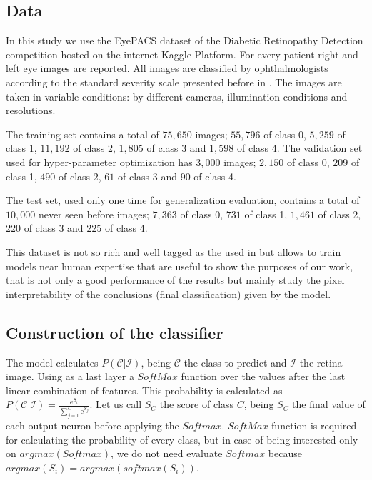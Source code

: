 \documentclass[preprint]{elsarticle}
\theoremstyle{definition} %
\theoremstyle{remark}
\newcommand{\me}{\mathrm{e}} %
\begin{document}
\subsection{Data}

In this study we use the EyePACS dataset of the Diabetic Retinopathy Detection competition hosted on the internet Kaggle Platform.  For every patient right and left eye images are reported. All images are classified by ophthalmologists according to the standard severity scale presented before in \cite{diaclass}. The images are taken in variable conditions: by different cameras, illumination conditions and resolutions. 

The training set contains a total of $75,650$ images; $55,796$ of class 0, $5,259$ of class 1, $11,192$ of class 2, $1,805$ of class 3 and $1,598$ of class 4. The validation set used for hyper-parameter optimization has $3,000$ images; $2,150$ of class 0, $209$ of class 1, $490$ of class 2, $61$ of class 3 and $90$ of class 4. 

The test set, used only one time for generalization evaluation, contains a total of $10,000$ never seen before images; $7,363$ of class 0, $731$ of class 1, $1,461$ of class 2, $220$ of class 3 and $225$ of class 4. 

This dataset is not so rich and well tagged as the used in \cite{doi:10.1001/jama.2016.17216} but allows to train models near human expertise that are useful to show the purposes of our work, that is not only a good performance of the results but mainly study the pixel interpretability of the conclusions (final classification) given by the model.

\subsection{Construction of the classifier}

The model calculates $P(\mathcal{C} | \mathcal{I})$, being $\mathcal{C}$ the class to predict and $\mathcal{I}$ the retina image. Using as a last layer a $SoftMax$ function over the values after the last linear combination of features. This probability is calculated as $P(\mathcal{C} | \mathcal{I}) = \frac{\me^{S_{i}}}{\sum_{j=1}^{C} \me^{S_{j}}}$. Let us call $S_{C}$ the score of class $C$, being $S_C$ the final value of each output neuron before applying the $Softmax$. $SoftMax$ function is required for calculating the probability of every class, but in case of being interested only on $argmax(Softmax)$, we do not need evaluate $Softmax$ because $argmax(S_i) = argmax(softmax(S_i))$.
\end{document}
